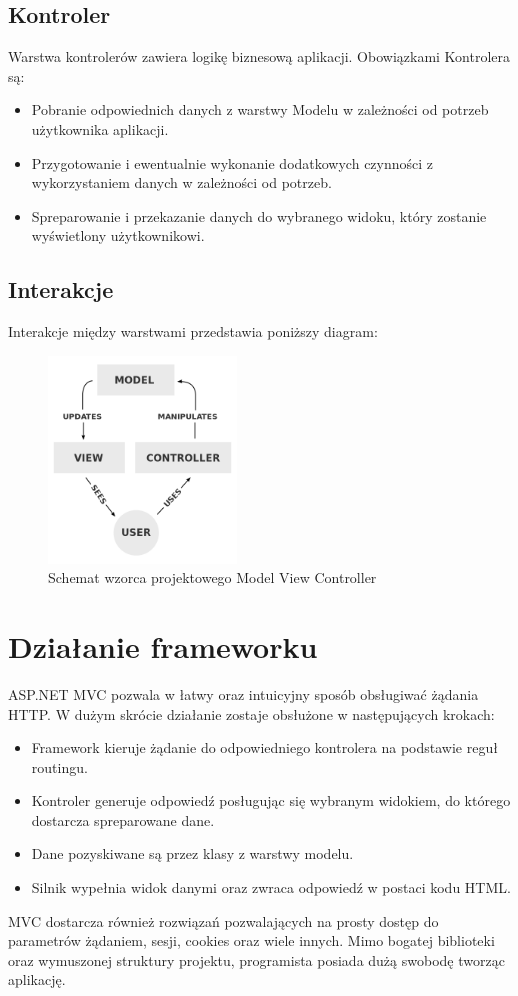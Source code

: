 \subsection{Kontroler}
Warstwa kontrolerów zawiera logikę biznesową aplikacji. Obowiązkami Kontrolera są:
\begin{itemize}
\item Pobranie odpowiednich danych z warstwy Modelu w zależności od potrzeb użytkownika aplikacji.
\item Przygotowanie i ewentualnie wykonanie dodatkowych czynności z wykorzystaniem danych w zależności od potrzeb.
\item Spreparowanie i przekazanie danych do wybranego widoku, który zostanie wyświetlony użytkownikowi. 
\end{itemize}

\subsection{Interakcje}
Interakcje między warstwami przedstawia poniższy diagram:
\begin{figure}[h]
	\includegraphics[height=55mm]{./img/mvc.png}
	\caption{Schemat wzorca projektowego Model View Controller}
	\label{fig:mvc-scheme}
\end{figure}


\section{Działanie frameworku}
ASP.NET MVC pozwala w łatwy oraz intuicyjny sposób obsługiwać żądania HTTP. W dużym skrócie działanie zostaje obsłużone w następujących krokach:
\begin{itemize}
\item Framework kieruje żądanie do odpowiedniego kontrolera na podstawie reguł routingu.
\item Kontroler generuje odpowiedź posługując się wybranym widokiem, do którego dostarcza spreparowane dane.
\item Dane pozyskiwane są przez klasy z warstwy modelu.
\item Silnik wypełnia widok danymi oraz zwraca odpowiedź w postaci kodu HTML.
\end{itemize}
MVC dostarcza również rozwiązań pozwalających na prosty dostęp do parametrów żądaniem, sesji, cookies oraz wiele innych. Mimo bogatej biblioteki oraz wymuszonej struktury projektu, programista posiada dużą swobodę tworząc aplikację.

